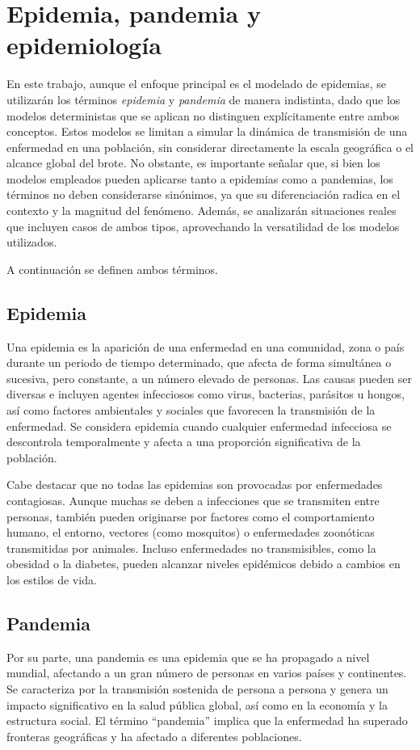 \setcounter{secnumdepth}{3}
\section{Epidemia, pandemia y epidemiología}
En este trabajo, aunque el enfoque principal es el modelado de epidemias, se utilizarán los términos \textit{epidemia} y \textit{pandemia} de manera indistinta, dado que los modelos deterministas que se aplican no distinguen explícitamente entre ambos conceptos. Estos modelos se limitan a simular la dinámica de transmisión de una enfermedad en una población, sin considerar directamente la escala geográfica o el alcance global del brote.
No obstante, es importante señalar que, si bien los modelos empleados pueden aplicarse tanto a epidemias como a pandemias, los términos no deben considerarse sinónimos, ya que su diferenciación radica en el contexto y la magnitud del fenómeno. Además, se analizarán situaciones reales que incluyen casos de ambos tipos, aprovechando la versatilidad de los modelos utilizados.

A continuación se definen ambos términos.

\subsection{Epidemia}
Una epidemia es la aparición de una enfermedad en una comunidad, zona o país durante un periodo de tiempo determinado, que afecta de forma simultánea o sucesiva, pero constante, a un número elevado de personas. Las causas pueden ser diversas e incluyen agentes infecciosos como virus, bacterias, parásitos u hongos, así como factores ambientales y sociales que favorecen la transmisión de la enfermedad. Se considera epidemia cuando cualquier enfermedad infecciosa se descontrola temporalmente y afecta a una proporción significativa de la población.

Cabe destacar que no todas las epidemias son provocadas por enfermedades contagiosas. Aunque muchas se deben a infecciones que se transmiten entre personas, también pueden originarse por factores como el comportamiento humano, el entorno, vectores (como mosquitos) o enfermedades zoonóticas transmitidas por animales. Incluso enfermedades no transmisibles, como la obesidad o la diabetes, pueden alcanzar niveles epidémicos debido a cambios en los estilos de vida.


\subsection{Pandemia}
Por su parte, una pandemia es una epidemia que se ha propagado a nivel mundial, afectando a un gran número de personas en varios países y continentes. Se caracteriza por la transmisión sostenida de persona a persona y genera un impacto significativo en la salud pública global, así como en la economía y la estructura social. El término “pandemia” implica que la enfermedad ha superado fronteras geográficas y ha afectado a diferentes poblaciones.

